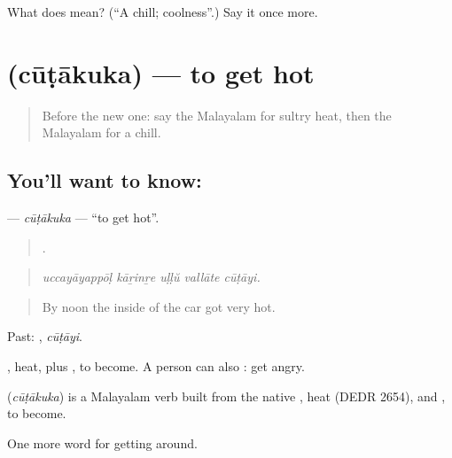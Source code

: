 \begin{tcolorbox}[breakable,colback=teal!4,colframe=teal!35!black,title={Before you move on}]
What does  mean? (\textquotedblleft{}A chill; coolness\textquotedblright{}.) Say it once more.
\end{tcolorbox}
\section[\texorpdfstring{\ml{ചൂടാകുക} (cūṭākuka)}{ചൂടാകുക (cūṭākuka)}]{ (cūṭākuka) — to get hot}

\label{lesson:ML-C509-cutakuka}



\begin{quote}
Before the new one: say the Malayalam for sultry heat, then the Malayalam for a chill.
\end{quote}

\subsection*{You'll want to know: }
\textbf{} — \emph{cūṭākuka} — \textquotedblleft{}to get hot\textquotedblright{}.

\begin{quote}
    .
\end{quote}

\begin{quote}
\emph{uccayāyappōḷ kāṟinṟe uḷḷŭ vallāte cūṭāyi.}
\end{quote}

\begin{quote}
By noon the inside of the car got very hot.
\end{quote}

Past: , \emph{cūṭāyi}.

, heat, plus , to become. A person can also : get angry.

\begin{cousinweb}
\textbf{} (\emph{cūṭākuka}) is a Malayalam verb built from the native , heat (DEDR 2654), and , to become.
\end{cousinweb}

\begin{grammarlens}[title={What you've built}]
One more word for getting around.
\end{grammarlens}

